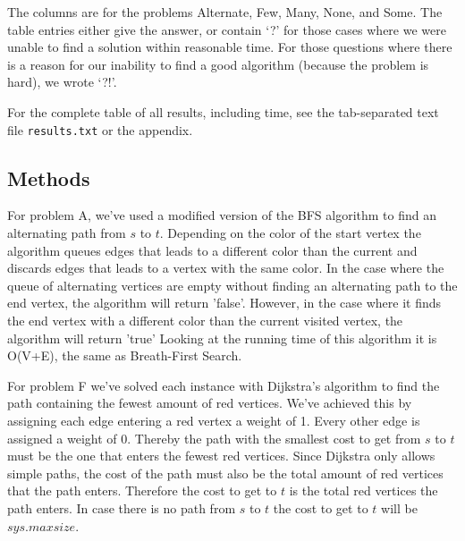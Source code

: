 \documentclass[a4paper]{article}
\begin{document}
The columns are for the problems Alternate, Few, Many, None, and Some.
The table entries either give the answer, or contain `?' for those cases where we were unable to find a solution within reasonable time.
For those questions where there is a reason for our inability to find a good algorithm (because the problem is hard), we wrote `?!'.

For the complete table of all results, including time, see the tab-separated text file {\tt results.txt} or the appendix.

\subsection{Methods}
For problem A, we've used a modified version of the BFS algorithm to find an alternating path from $s$ to $t$. Depending on the color of the start vertex the algorithm queues edges that leads to a different color than the current and discards edges that leads to a vertex with the same color. In the case where the queue of alternating vertices are empty without finding an alternating path to the end vertex, the algorithm will return 'false'. However, in the case where it finds the end vertex with a different color than the current visited vertex, the algorithm will return 'true'
Looking at the running time of this algorithm it is O(V+E), the same as Breath-First Search.

For problem F we've solved each instance with Dijkstra's algorithm to find the path containing the fewest amount of red vertices. We've achieved this by assigning each edge entering a red vertex a weight of 1. Every other edge is assigned a weight of 0. Thereby the path with the smallest cost to get from $s$ to $t$ must be the one that enters the fewest red vertices. Since Dijkstra only allows simple paths, the cost of the path must also be the total amount of red vertices that the path enters. Therefore the cost to get to $t$ is the total red vertices the path enters. In case there is no path from $s$ to $t$ the cost to get to $t$ will be $sys.maxsize$.
\end{document}
